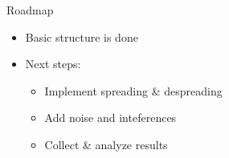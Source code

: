 		\begin{frame}{Roadmap}
			\begin{itemize}
				\item<1->
				Basic structure is done
				
				\item<2->
				Next steps:
				\begin{itemize}
    				\item<2-> Implement spreading \& despreading
    				\item<3-> Add noise and inteferences
    				\item<4-> Collect \& analyze results
				\end{itemize}
			\end{itemize}
			\vspace{1cm}
		\end{frame}